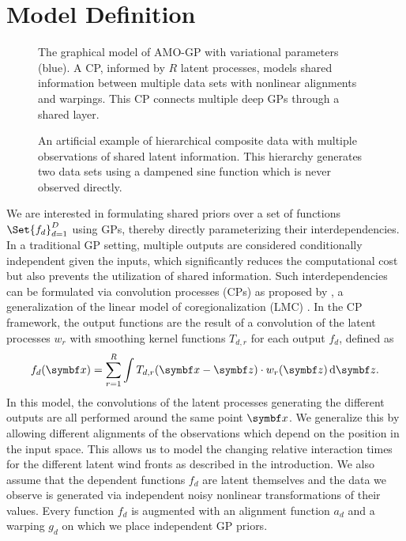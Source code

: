 \section{Model Definition}
\label{toc:alignment:model}
\begin{figure}[t]
    \centering
    
    \caption{
        \label{fig:alignment:graphical_model_supervised}
        The graphical model of AMO-GP with variational parameters (blue).
        A CP, informed by $R$ latent processes, models shared information between multiple data sets with nonlinear alignments and warpings.
        This CP connects multiple deep GPs through a shared layer.
    }
\end{figure}
\begin{figure}[t]
    \centering
    \caption{
        \label{fig:alignment:dampened_sine_decomposition}
        An artificial example of hierarchical composite data with multiple observations of shared latent information.
        This hierarchy generates two data sets using a dampened sine function which is never observed directly.
    }
\end{figure}
We are interested in formulating shared priors over a set of functions $\Set{f_d}_{d=1}^D$ using GPs, thereby directly parameterizing their interdependencies.
In a traditional GP setting, multiple outputs are considered conditionally independent given the inputs, which significantly reduces the computational cost but also prevents the utilization of shared information.
Such interdependencies can be formulated via convolution processes (CPs) as proposed by \textcite{boyle_dependent_2004}, a generalization of the linear model of coregionalization (LMC) \parencite{journel_mining_1978,coburn_geostatistics_2000}.
In the CP framework, the output functions are the result of a convolution of the latent processes $w_r$ with smoothing kernel functions $T_{d,r}$ for each output $f_d$, defined as
\begin{align}
    f_d(\mat{x}) = \sum_{r=1}^R \int T_{d,r}(\mat{x} - \mat{z}) \cdot w_r(\mat{z}) \diff \mat{z}.
\end{align}
In this model, the convolutions of the latent processes generating the different outputs are all performed around the same point $\mat{x}$.
We generalize this by allowing different alignments of the observations which depend on the position in the input space.
This allows us to model the changing relative interaction times for the different latent wind fronts as described in the introduction.
We also assume that the dependent functions $f_d$ are latent themselves and the data we observe is generated via independent noisy nonlinear transformations of their values.
Every function $f_d$ is augmented with an alignment function $a_d$ and a warping $g_d$ on which we place independent GP priors.

